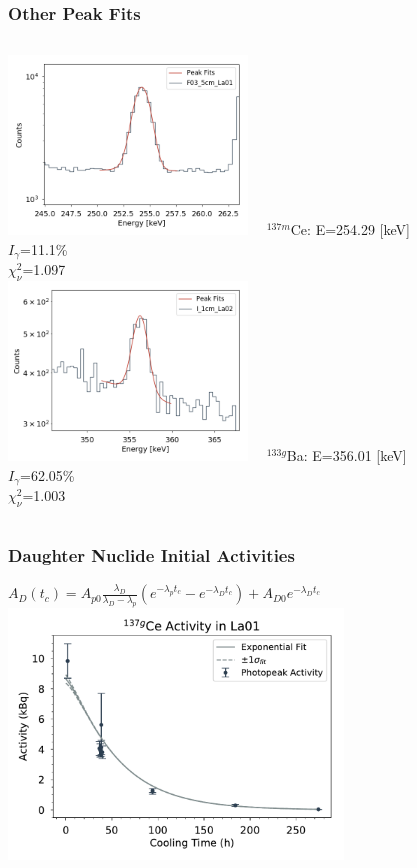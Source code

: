 \documentclass[12pt,xcolor=dvipsnames]{beamer}
\begin{document}
\begin{frame}
\frametitle{Other Peak Fits}
\begin{columns}[c]
\column{2.5in}
\includegraphics[width=2.5in]{CE137m_fit.png}
\centering
\ \ $^{137m}$Ce: E=254.29 [keV]\\ $I_{\gamma}$=11.1\%\\ $\chi^2_{\nu}$=1.097
\\
\column{2.5in}
\includegraphics[width=2.5in]{BA133g_fit.png}
\centering
\ \ $^{133g}$Ba: E=356.01 [keV]\\ $I_{\gamma}$=62.05\%\\ $\chi^2_{\nu}$=1.003
\\
\end{columns}
\end{frame}

\begin{frame}
\frametitle{Daughter Nuclide Initial Activities}

$A_D(t_c) = A_{p0}\frac{\lambda_D}{\lambda_D - \lambda_p}(e^{-\lambda_p t_c}-e^{-\lambda_D t_c})+A_{D0}e^{-\lambda_D t_c}$
\\
\centering
\includegraphics[width=3.5in]{decay_curves/La01_137CEg}
\end{frame}
\end{document}
